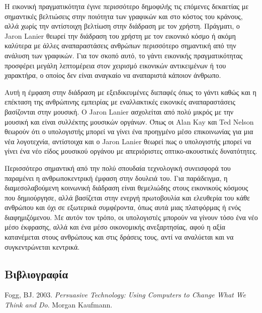 \documentclass[
]{article}
\newlength{\cslhangindent}
\newlength{\cslentryspacingunit} %
\newenvironment{CSLReferences}[2] %
 {%
  \setlength{\parindent}{0pt}
  \ifodd #1
  \let\oldpar\par
  \def\par{\hangindent=\cslhangindent\oldpar}
  \fi
  \setlength{\parskip}{#2\cslentryspacingunit}
 }%
 {}
\begin{document}
Η εικονική πραγματικότητα έγινε περισσότερο δημοφιλής τις επόμενες
δεκαετίας με σημαντικές βελτιώσεις στην ποιότητα των γραφικών και στο
κόστος του κράνους, αλλά χωρίς την αντίστοιχη βελτίωση στην διάδραση με
τον χρήστη. Πράγματι, ο Jaron Lanier θεωρεί την διάδραση του χρήστη με
τον εικονικό κόσμο ή ακόμη καλύτερα με άλλες αναπαραστάσεις ανθρώπων
περισσότερο σημαντική από την ανάλυση των γραφικών. Για τον σκοπό αυτό,
το γάντι εικονικής πραγματικότητας προσφέρει μεγάλη λεπτομέρεια στον
χειρισμό εικονικών αντικειμένων ή του χαρακτήρα, ο οποίος δεν είναι
αναγκαίο να αναπαριστά κάποιον άνθρωπο.

Αυτή η έμφαση στην διάδραση με εξειδικευμένες διεπαφές όπως το γάντι
καθώς και η επέκταση της ανθρώπινης εμπειρίας με εναλλακτικές εικονικές
αναπαραστάσεις βασίζονται στην μουσική. O Jaron Lanier ασχολείται από
πολύ μικρός με την μουσική και είναι συλλέκτης μουσικών οργάνων. Όπως οι
Alan Kay και Ted Nelson θεωρούν ότι ο υπολογιστής μπορεί να γίνει ένα
προηγμένο μέσο επικοινωνίας για μια νέα λογοτεχνία, αντίστοιχα και ο
Jaron Lanier θεωρεί πως ο υπολογιστής μπορεί να γίνει ένα νέο είδος
μουσικού οργάνου με απεριόριστες οπτικο-ακουστικές δυνατότητες.

Περισσότερο σημαντική από την πολύ σπουδαία τεχνολογική συνεισφορά του
παραμένει η ανθρωποκεντρική έμφαση στην δουλειά του. Για παράδειγμα, η
διαμεσολαβούμενη κοινωνική διάδραση είναι θεμελιώδης στους εικονικούς
κόσμους που δημιούργησε, αλλά βασίζεται στην ενεργή πρωτοβουλία και
ελευθερία του κάθε ανθρώπου και όχι σε εξωτερικά συμφέροντα, όπως αυτά
μιας πλατφόρμας ή ενός διαφημιζόμενου. Με αυτόν τον τρόπο, οι
υπολογιστές μπορούν να γίνουν τόσο ένα νέο μέσο έκφρασης, αλλά και ένα
μέσο οικονομικής ανεξαρτησίας, αφού η αξία κατανέμεται στους ανθρώπους
και στις δράσεις τους, αντί να αναλύεται και να συγκεντρώνεται κεντρικά.

\hypertarget{ux3b2ux3b9ux3b2ux3bbux3b9ux3bfux3b3ux3c1ux3b1ux3c6ux3afux3b1}{%
\subsection*{Βιβλιογραφία}\label{ux3b2ux3b9ux3b2ux3bbux3b9ux3bfux3b3ux3c1ux3b1ux3c6ux3afux3b1}}

\hypertarget{refs}{}
\begin{CSLReferences}{0}{0}
\end{CSLReferences}

Fogg, BJ. 2003. \emph{Persuasive Technology: Using Computers to Change
What We Think and Do}. Morgan Kaufmann.
\end{document}
